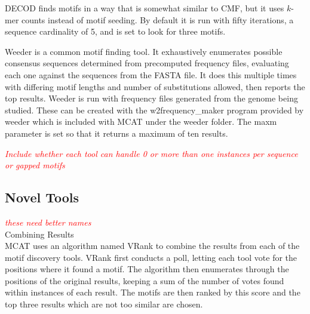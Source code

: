 \documentclass[12pt]{article}
\newenvironment{SLOPPY}{\begin{sloppypar}\hbadness=10000}{\end{sloppypar}}
\newcommand{\comment}[1]{\textcolor{red}{\it{#1}}}
\begin{document}
\begin{SLOPPY}
DECOD \cite{Huggins01092011} finds motifs in a way that is somewhat similar
to CMF, but it uses $k$-mer counts instead of motif seeding. By default it is
run with fifty iterations, a sequence cardinality of 5, and is set to look for
three motifs.
\\
\end{SLOPPY}

\begin{SLOPPY}
Weeder \cite{Pavesi01072004} is a common motif finding tool.
It exhaustively enumerates possible consensus sequences determined from
precomputed frequency files, evaluating each one against
the sequences from the FASTA file. It does this multiple times with differing
motif lengths and number of substitutions allowed, then reports the top 
results. Weeder is run with frequency files generated from the genome being
studied. These can be created with the w2frequency\_maker program provided
by weeder which is included with MCAT under the weeder folder.
The maxm parameter is set so that it
returns a maximum of ten results.
\\
\end{SLOPPY}

\noindent
\begin{SLOPPY}
\comment{Include whether each tool can handle 0 or more than
one instances per
sequence or gapped motifs}\\
\end{SLOPPY}

\noindent
\subsection{Novel Tools}
\begin{SLOPPY}
\comment{these need better names}\\

\noindent
Combining Results\\
MCAT uses an algorithm named VRank to combine the results from each of the
motif discovery tools. VRank first conducts a poll, letting each tool vote
for the
positions where it found a motif. The algorithm then enumerates through the
positions of the original results, keeping a sum of the number of votes found
within instances of
each result. The motifs are then ranked by this score and the top three results
which are not too similar are chosen.\\
\end{SLOPPY}
\end{document}
